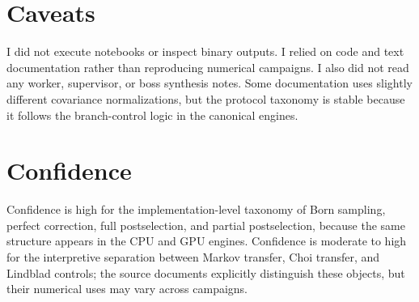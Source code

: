 \documentclass[aps,prb,onecolumn,nofootinbib,superscriptaddress]{revtex4-2}
\begin{document}
\section{Caveats}

I did not execute notebooks or inspect binary outputs.  I relied on code and
text documentation rather than reproducing numerical campaigns.  I also did not
read any worker, supervisor, or boss synthesis notes.  Some documentation uses
slightly different covariance normalizations, but the protocol taxonomy is
stable because it follows the branch-control logic in the canonical engines.

\section{Confidence}

Confidence is high for the implementation-level taxonomy of Born sampling,
perfect correction, full postselection, and partial postselection, because the
same structure appears in the CPU and GPU engines.  Confidence is moderate to
high for the interpretive separation between Markov transfer, Choi transfer, and
Lindblad controls; the source documents explicitly distinguish these objects,
but their numerical uses may vary across campaigns.
\end{document}
